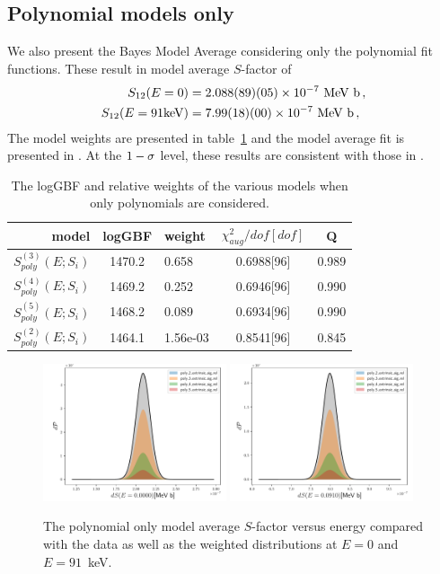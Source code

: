 \documentclass[prd,10pt,superscriptaddress,notitlepage,tightenlines,nofootinbib,floatfix]{revtex4-1}
\begin{document}
\subsection{Polynomial models only}

We also present the Bayes Model Average considering only the polynomial fit functions.
These result in model average $S$-factor of
\begin{align}
S_{12}(E=0) &= 2.088(89)(05)\times10^{-7} \textrm{ MeV b}\, ,
\nonumber\\
S_{12}(E=91{\rm keV}) &= 7.99(18)(00)\times10^{-7} \textrm{ MeV b}\, ,
\end{align}
The model weights are presented in table~\ref{tab:poly} and the model average fit is presented in .
At the $1-{\sigma}$ level, these results are consistent with those in .

\begin{table}
\begin{ruledtabular}
\begin{tabular}{rclcc}
model& logGBF& weight& $\chi_{aug}^2/dof[dof]$& Q\\
\hline
$S_{poly}^{(3)}(E; S_i)$& 1470.2 & 0.658 & 0.6988[96] & 0.989\\
$S_{poly}^{(4)}(E; S_i)$& 1469.2 & 0.252 & 0.6946[96] & 0.990\\
$S_{poly}^{(5)}(E; S_i)$& 1468.2 & 0.089 & 0.6934[96] & 0.990\\
$S_{poly}^{(2)}(E; S_i)$& 1464.1 & 1.56e-03 & 0.8541[96] & 0.845\\
\end{tabular}
\end{ruledtabular}
\caption{\label{tab:poly}
The logGBF and relative weights of the various models when only polynomials are considered.
}
\end{table}
    
\begin{figure}
\includegraphics[width=0.48\textwidth]{figures/S_E0.0000_hist_poly}
\includegraphics[width=0.48\textwidth]{figures/S_E0.0910_hist_poly}
\caption{\label{fig:poly}
The polynomial only model average $S$-factor versus energy compared with the data as well as the weighted distributions at $E=0$ and $E=91$~keV.}
\end{figure}
\end{document}
